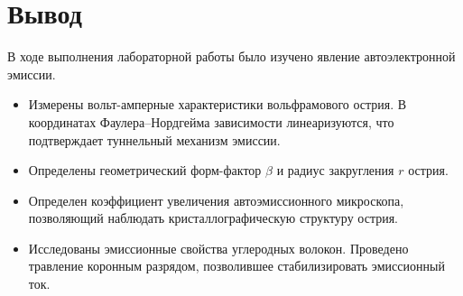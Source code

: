 \documentclass[a4paper]{article}
\begin{document}



\section{Вывод}
В ходе выполнения лабораторной работы было изучено явление автоэлектронной эмиссии. 
\begin{itemize}
    \item Измерены вольт-амперные характеристики вольфрамового острия. В координатах Фаулера--Нордгейма зависимости линеаризуются, что подтверждает туннельный механизм эмиссии.
    \item Определены геометрический форм-фактор $\beta$ и радиус закругления $r$ острия.
    \item Определен коэффициент увеличения автоэмиссионного микроскопа, позволяющий наблюдать кристаллографическую структуру острия.
    \item Исследованы эмиссионные свойства углеродных волокон. Проведено травление коронным разрядом, позволившее стабилизировать эмиссионный ток.
\end{itemize}
\end{document}
